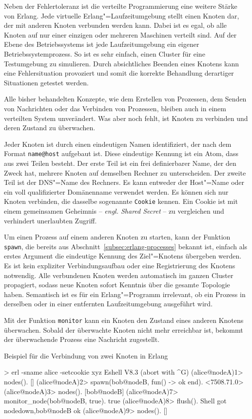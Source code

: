 Neben der Fehlertoleranz ist die verteilte Programmierung eine weitere Stärke von Erlang. Jede virtuelle Erlang"=Laufzeitumgebung stellt einen Knoten dar, der mit anderen Knoten verbunden werden kann. Dabei ist es egal, ob alle Knoten auf nur einer einzigen oder mehreren Maschinen verteilt sind. Auf der Ebene des Betriebssystems ist jede Laufzeitumgebung ein eigener Betriebssystemprozess. So ist es sehr einfach, einen Cluster für eine Testumgebung zu simulieren. Durch absichtliches Beenden eines Knotens kann eine Fehlersituation provoziert und somit die korrekte Behandlung derartiger Situationen getestet werden.

Alle bisher behandelten Konzepte, wie dem Erstellen von Prozessen, dem Senden von Nachrichten oder das Verbinden von Prozessen, bleiben auch in einem verteilten System unverändert. Was aber noch fehlt, ist Knoten zu verbinden und deren Zustand zu überwachen.

Jeder Knoten ist durch einen eindeutigen Namen identifiziert, der nach dem Format \lstinline{name@host} aufgebaut ist. Diese eindeutige Kennung ist ein Atom, dass aus zwei Teilen besteht. Der erste Teil ist ein frei definierbarer Name, der den Zweck hat, mehrere Knoten auf demselben Rechner zu unterscheiden. Der zweite Teil ist der DNS"=Name des Rechners. Es kann entweder der Host"=Name oder ein voll qualifizierter Domänenname verwendet werden. Es können sich nur Knoten verbinden, die dasselbe sogenannte \lstinline{Cookie} kennen. Ein Cookie ist mit einem gemeinsamen Geheimnis -- \textit{engl. Shared Secret} -- zu vergleichen und verhindert unerlaubten Zugriff.

Um einen Prozess auf einem anderen Knoten zu starten, kann der Funktion \lstinline{spawn}, die bereits aus Abschnitt~\ref{subsec:erlang-processes} bekannt ist, einfach als erstes Argument die eindeutige Kennung des Ziel"=Knotens übergeben werden. Es ist kein expliziter Verbindungsaufbau oder eine Registrierung des Knotens notwendig. Alle verbundenen Knoten werden automatisch im ganzen Cluster propagiert, sodass neue Knoten sofort Kenntnis über die gesamte Topologie haben. Semantisch ist es für ein Erlang"=Programm irrelevant, ob ein Prozess in derselben oder in einer entfernten Laufzeitumgebung ausgeführt wird.

Mit der Funktion \lstinline{monitor} kann ein Knoten den Zustand eines anderen Knotens überwachen. Sobald der überwachte Knoten nicht mehr erreichbar ist, bekommt der überwachende Prozess eine Nachricht zugestellt.

\begin{program}[!hbt]
\caption{Beispiel für die Verbindung von zwei Knoten in Erlang}
\label{prog:erlang-distributed}
\begin{ErlangCode}
> erl -sname alice -setcookie xyz
Eshell V8.3  (abort with ^G)
(alice@nodeA)1> nodes().
[]
(alice@nodeA)2> spawn(bob@nodeB, fun() -> ok end).
<7508.71.0>
(alice@nodeA)3> nodes().
[bob@nodeB]
(alice@nodeA)7> monitor_node(bob@nodeB, true).
true
(alice@nodeA)8> flush(). %
Shell got {nodedown,bob@nodeB}
ok
(alice@nodeA)9> nodes().
[]
\end{ErlangCode}
\end{program}

